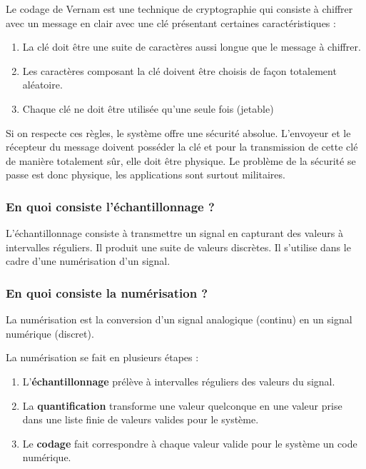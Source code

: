 Le codage de Vernam est une technique de cryptographie qui consiste à chiffrer avec un message \og{}en clair\fg{} avec une clé présentant certaines caractéristiques :

\begin{enumerate}
    \item La clé doit être une suite de caractères aussi longue que le message à chiffrer.
    \item Les caractères composant la clé doivent être choisis de façon totalement aléatoire.
    \item Chaque clé ne doit être utilisée qu'une seule fois (jetable)
\end{enumerate}

Si on respecte ces règles, le système offre une sécurité absolue.  L'envoyeur et le récepteur du message doivent posséder la clé et pour la transmission de cette clé de manière totalement sûr, elle doit être physique. Le problème de la sécurité se passe est donc physique, les applications sont surtout militaires.

\subsubsection{En quoi consiste l'échantillonnage ?}

L'échantillonnage consiste à transmettre un signal en capturant des valeurs à intervalles réguliers. Il produit une suite de valeurs discrètes. Il s'utilise dans le cadre d'une numérisation d'un signal.  

\subsubsection{En quoi consiste la numérisation ?}

La numérisation est la conversion d'un signal analogique (continu) en un signal numérique (discret).

La numérisation se fait en plusieurs étapes :
\begin{enumerate}
    \item L'\textbf{échantillonnage} prélève à intervalles réguliers des valeurs du signal.
    \item La \textbf{quantification} transforme une valeur quelconque en une valeur prise dans une liste finie de valeurs valides pour le système.
    \item Le \textbf{codage} fait correspondre à chaque valeur valide pour le système un code numérique.
\end{enumerate}


